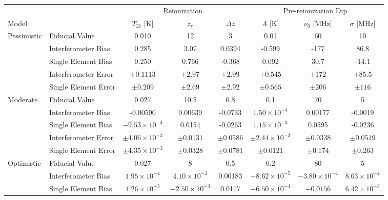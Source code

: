\documentclass[twocolumn,apj,numberedappendix]{emulateapj}
\begin{document}
\begin{table}[htbp]
   \centering
   \begin{tabular}{@{} llcccccc @{}} %
      \toprule
      & & \multicolumn{3}{c}{Reionization} & \multicolumn{3}{c}{Pre-reionization Dip} \\
      \cmidrule(lr){3-5} %
      \cmidrule(lr){6-8} 
      Model &  & $T_{21}$ [K] & $z_r$ & $\Delta z$ & $A$ [K] & $\nu_0$ [MHz] & $\sigma$ [MHz]\\
      \midrule
      Pessimistic & Fiducial Value & 0.010 & 12 & 3 & 0.01 & 60 & 10 \\
      \cmidrule(l){2-8} 
      			 & Interferometer Bias & 0.285 & 3.07 & 0.0394 & -0.599 & -177 & 86.8 \\
			 & Single Element Bias & 0.250 & 0.766 & -0.368 & 0.092 & 30.7 & -14.1 \\	 
      			 & Interferometer Error & $\pm 0.1113$ & $\pm 2.97$ & $\pm 2.99$ & $\pm 0.545$ & $\pm 172$ & $\pm 85.5$ \\
      			 & Single Element Error  & $\pm 0.209 $ & $\pm 2.69$ & $\pm 2.92$ & $\pm 0.565$ & $\pm 206$ & $\pm 116$ \\
      \midrule
      Moderate & Fiducial Value & 0.027 & 10.5 & 0.8 & 0.1 & 70 & 5 \\
      \cmidrule(l){2-8}
			 & Interferometer Bias & -0.00590 & 0.00639 & -0.0733 & $1.50\times10^{-4}$ & 0.00177 & -0.0019 \\
			 & Single Element Bias & $-9.53 \times 10^{-4}$ & 0.0154 & -0.0263 & $1.15\times10^{-3}$ & 0.0595 & -0.0236 \\	
      			 & Interferometer Error & $\pm 4.06\times 10^{-3}$ & $\pm 0.0131$ & $\pm 0.0586$ & $\pm 2.44 \times 10^{-3}$ & $\pm 0.0338$ & $\pm 0.0519$ \\
      			 & Single Element Error  & $\pm 4.35 \times 10^{-3}$ & $\pm 0.0328$ & $\pm 0.0781$ & $\pm 0.0121$ & $\pm 0.174$ & $\pm 0.263$ \\
      \midrule
      Optimistic & Fiducial Value & 0.027 & 8 & 0.5 & 0.2 & 80 & 5 \\
      \cmidrule(l){2-8}
			 & Interferometer Bias & $1.95\times10^{-4}$ & $4.10\times10^{-3}$ & 0.00183 & $-8.62\times 10^{-5}$ &$ -3.80\times 10^{-4}$ & $8.63\times 10^{-4}$ \\
			 & Single Element Bias & $1.26\times10^{-3}$ & $-2.50\times10^{-3}$ & 0.0117 & $-6.50\times10^{-4}$ & $-0.0156$ & $6.42\times10^{-3}$ \\

\end{tabular}
\end{table}
\end{document}
